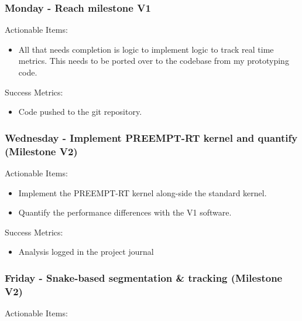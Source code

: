 \subsubsection{Monday - Reach milestone V1}

Actionable Items:

\begin{itemize}
    \item All that needs completion is logic to implement logic to track real time metrics. This needs to be ported over to the codebase from my prototyping code.
\end{itemize}

Success Metrics:

\begin{itemize}
    \item Code pushed to the git repository.
\end{itemize}




\subsubsection{Wednesday - Implement PREEMPT-RT kernel and quantify (Milestone V2)}

Actionable Items:

\begin{itemize}
    \item Implement the PREEMPT-RT kernel along-side the standard kernel.
    \item Quantify the performance differences with the V1 software.
\end{itemize}

Success Metrics:

\begin{itemize}
    \item Analysis logged in the project journal
\end{itemize}






\subsubsection{Friday - Snake-based segmentation \& tracking (Milestone V2)}

Actionable Items:

